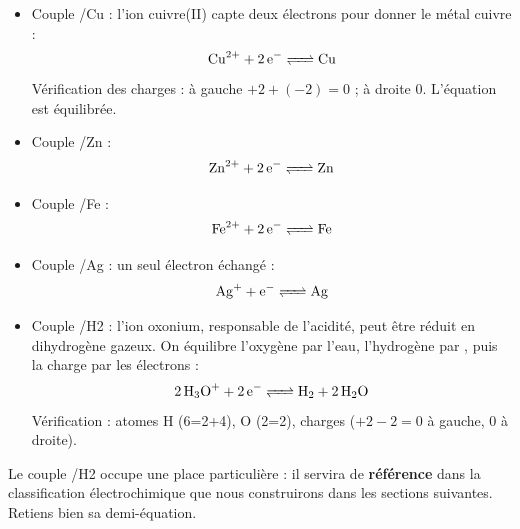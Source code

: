 \documentclass[11pt]{article}
\begin{document}
\begin{exemplebox}
\begin{itemize}
\item Couple /Cu : l'ion cuivre(II) capte deux électrons pour donner le métal cuivre :
\[ \ce{Cu^2+ + 2e- <=> Cu} \]
Vérification des charges : à gauche $+2 + (-2) = 0$ ; à droite $0$. L'équation est équilibrée.
\item Couple /Zn :
\[ \ce{Zn^2+ + 2e- <=> Zn} \]
\item Couple /Fe :
\[ \ce{Fe^2+ + 2e- <=> Fe} \]
\item Couple /Ag : un seul électron échangé :
\[ \ce{Ag+ + e- <=> Ag} \]
\item Couple /H2 : l'ion oxonium, responsable de l'acidité, peut être réduit en dihydrogène gazeux. On équilibre l'oxygène par l'eau, l'hydrogène par , puis la charge par les électrons :
\[ \ce{2H3O+ + 2e- <=> H2 + 2H2O} \]
Vérification : atomes H (6=2+4), O (2=2), charges ($+2-2=0$ à gauche, $0$ à droite).
\end{itemize}
\end{exemplebox}

Le couple /H2 occupe une place particulière : il servira de \textbf{référence} dans la classification électrochimique que nous construirons dans les sections suivantes. Retiens bien sa demi-équation.
\end{document}
